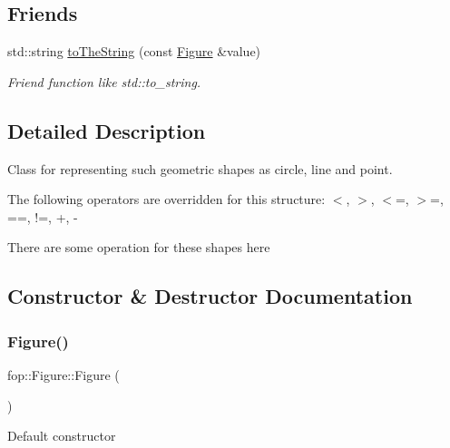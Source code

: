 \subsection*{Friends}
\begin{DoxyCompactItemize}
\item 
std\+::string \mbox{\hyperlink{classfop_1_1_figure_a64f76b9a0cc2e1c8d1f1a8a025e76078}{to\+The\+String}} (const \mbox{\hyperlink{classfop_1_1_figure}{Figure}} \&value)
\begin{DoxyCompactList}\small\item\em Friend function like std\+::to\+\_\+string. \end{DoxyCompactList}\end{DoxyCompactItemize}


\subsection{Detailed Description}
Class for representing such geometric shapes as circle, line and point. 

The following operators are overridden for this structure\+: $<$, $>$, $<$=, $>$=, ==, !=, +, -\/

There are some operation for these shapes here 

\subsection{Constructor \& Destructor Documentation}
\mbox{\label{classfop_1_1_figure_a624b2de787892723cbc48e67e847a2d6}} 
\subsubsection{\texorpdfstring{Figure()}{Figure()}\hspace{0.1cm}{\footnotesize\ttfamily [1/4]}}
{\footnotesize\ttfamily fop\+::\+Figure\+::\+Figure (\begin{DoxyParamCaption}{ }\end{DoxyParamCaption})}

Default constructor \mbox{\label{classfop_1_1_figure_af2154691492fa9cc825c7b4fc3224567}} 
